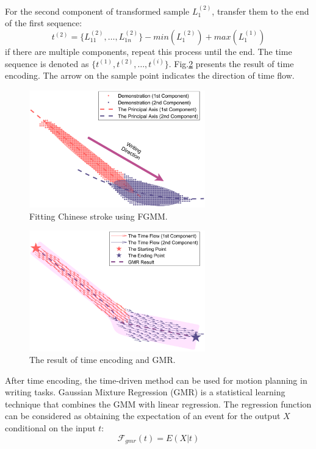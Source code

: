 \documentclass[conference]{IEEEtran}
\begin{document}
For the second component of transformed sample $L_{1}^{(2)}$, transfer them to the end of the first sequence:
\begin{equation}
    t^{(2)}=\{L_{11}^{(2)}, \hdots, L_{1n}^{(2)}\}-min(L_{1}^{(2)})+max(L_{1}^{(1)})
\end{equation}
if there are multiple components, repeat this process until the end. The time sequence is denoted as $\{t^{(1)},t^{(2)},\hdots,t^{(i)}\}$. Fig.\ref{fig4} presents the result of time encoding. The arrow on the sample point indicates the direction of time flow.
\begin{figure}[!t]
    \centering
    \includegraphics[width=3in]{./fig/fig3.pdf}
    \caption{Fitting Chinese stroke using FGMM.}
    \label{fig3}
\end{figure}

\begin{figure}[!t]
    \centering
    \includegraphics[width=3in]{./fig/fig4.pdf}
    \caption{The result of time encoding and GMR.}
    \label{fig4}
\end{figure}

After time encoding, the time-driven method can be used for motion planning in writing tasks. Gaussian Mixture Regression (GMR) is a statistical learning technique that combines the GMM with linear regression. The regression function can be considered as obtaining the expectation of an event for the output $X$ conditional on the input $t$:
\begin{equation}
    \mathcal{F} _{gmr}(t)=E(X|t)
\end{equation}
\end{document}
